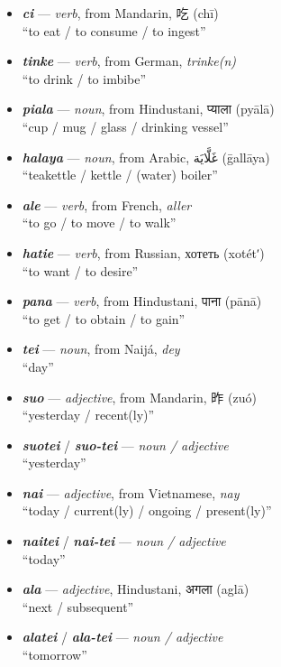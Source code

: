 \documentclass[a4paper, titlepage]{article}
\begin{document}
\begin{itemize}
	\item \textbf{\textit{ci}} — \textit{verb}, from Mandarin, 吃 (chī) \\``to eat / to consume / to ingest''
	\item \textbf{\textit{tinke}} — \textit{verb}, from German, \textit{trinke(n)} \\``to drink / to imbibe''
	\item \textbf{\textit{piala}} — \textit{noun}, from Hindustani, {\hmfont  प्याला} (pyālā) \\ ``cup / mug / glass / drinking vessel''
	\item \textbf{\textit{halaya}} — \textit{noun}, from Arabic, {\afont  غَلَّايَة } (ḡallāya) \\ ``teakettle / kettle / (water) boiler''
	\item \textbf{\textit{ale}} — \textit{verb}, from French, \textit{aller} \\``to go / to move / to walk''
	\item \textbf{\textit{hatie}} — \textit{verb}, from Russian, хотеть (xotétʹ) \\ ``to want / to desire''
	\item \textbf{\textit{pana}} — \textit{verb}, from Hindustani, {\hmfont पाना} (pānā) \\ ``to get / to obtain / to gain''
	\item \textbf{\textit{tei}} — \textit{noun}, from Naijá, \textit{dey} \\ ``day''
	\item \textbf{\textit{suo}} — \textit{adjective}, from Mandarin, 昨 (zuó) \\ ``yesterday / recent(ly)''
	\item \textbf{\textit{suotei}} / \textbf{\textit{suo-tei}} — \textit{noun /  adjective} \\ ``yesterday''
	\item \textbf{\textit{nai}} — \textit{adjective}, from Vietnamese, \textit{nay} \\ ``today / current(ly) / ongoing / present(ly)''
	\item \textbf{\textit{naitei}} / \textbf{\textit{nai-tei}} — \textit{noun /  adjective} \\ ``today''
	\item \textbf{\textit{ala}} — \textit{adjective}, Hindustani, {\hmfont अगला} (aglā) \\ ``next / subsequent''
	\item \textbf{\textit{alatei}} / \textbf{\textit{ala-tei}} — \textit{noun /  adjective} \\ ``tomorrow''

\end{itemize}
\end{document}
